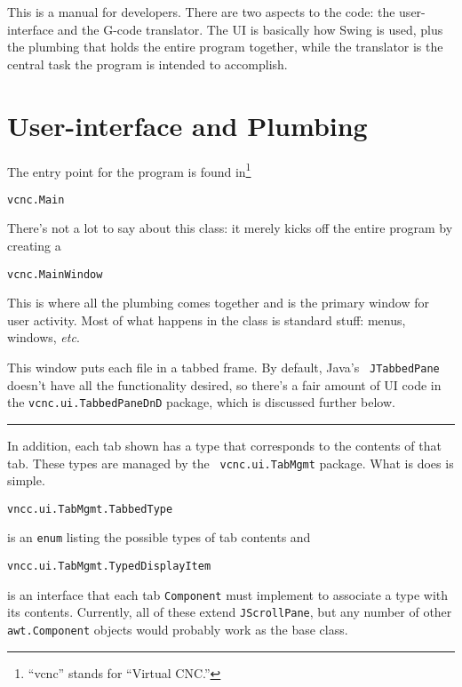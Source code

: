 \documentclass[titlepage,oneside,10pt]{article}
\newcommand\rulediv{\vskip 0mm\hfil\rule{0.4\textwidth}{0.4pt}\hfil\vskip 1mm}
\begin{document}
\raggedbottom

\newcommand{\mymargin}[1]{\marginpar{\rm\tiny #1}}
\newcommand{\leftmar}[1]{\reversemarginpar \mymargin{#1}}

This is a manual for developers.
There are two aspects to the code: the user-interface and the G-code
translator. The UI is basically how Swing is used, plus the plumbing
that holds the entire program together, while the translator
is the central task the program is intended to accomplish.

\section{User-interface and Plumbing}

The entry point for the program is found in\footnote{``vcnc'' stands
for ``Virtual CNC.''}
\begin{verbatim}
vcnc.Main
\end{verbatim}
There's not a lot to say about this class: it merely kicks off the entire
program by creating a 
\begin{verbatim}
vcnc.MainWindow
\end{verbatim}
This is where all the plumbing comes together and is the primary
window for user activity. Most of what happens in the class is
standard stuff: menus, windows, \emph{etc}.

This window puts each file in a tabbed frame. By default, Java's {\tt
  JTabbedPane} doesn't have all the functionality desired, so there's
a fair amount of UI code in the {\tt vcnc.ui.TabbedPaneDnD} package, which is
discussed further below.

\rulediv

In addition, each tab shown has a type that corresponds to the
contents of that tab. These types are managed by the {\tt
  vcnc.ui.TabMgmt} package. What is does is simple.

\begin{verbatim}
vncc.ui.TabMgmt.TabbedType
\end{verbatim}
is an {\tt enum} listing the possible types of tab contents and
\begin{verbatim}
vncc.ui.TabMgmt.TypedDisplayItem
\end{verbatim}
is an interface that each tab {\tt Component} must implement to
associate a type with its contents. Currently, all of these extend
{\tt JScrollPane}, but any number of other {\tt awt.Component}
objects would probably work as the base class.
\end{document}

